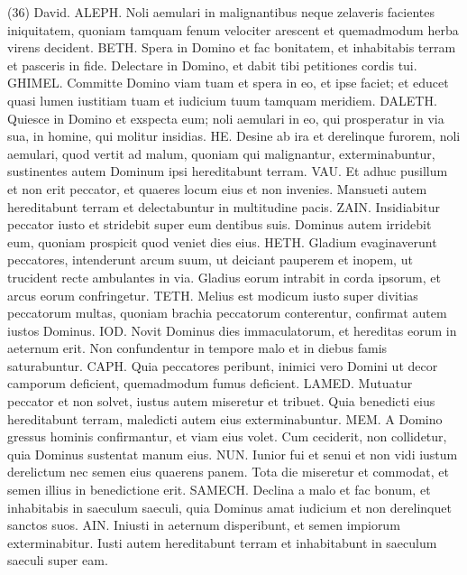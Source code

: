 \begin{biblechapter}  (36) 
\verse David. ALEPH. Noli aemulari in malignantibus neque zelaveris facientes iniquitatem, 
\verse quoniam tamquam fenum velociter arescent et quemadmodum herba virens decident. 
\verse BETH. Spera in Domino et fac bonitatem, et inhabitabis terram et pasceris in fide. 
\verse Delectare in Domino, et dabit tibi petitiones cordis tui. 
\verse GHIMEL. Committe Domino viam tuam et spera in eo, et ipse faciet; 
\verse et educet quasi lumen iustitiam tuam et iudicium tuum tamquam meridiem. 
\verse DALETH. Quiesce in Domino et exspecta eum; noli aemulari in eo, qui prosperatur in via sua, in homine, qui molitur insidias. 
\verse HE. Desine ab ira et derelinque furorem, noli aemulari, quod vertit ad malum, 
\verse quoniam qui malignantur, exterminabuntur, sustinentes autem Dominum ipsi hereditabunt terram. 
\verse VAU. Et adhuc pusillum et non erit peccator, et quaeres locum eius et non invenies. 
\verse Mansueti autem hereditabunt terram et delectabuntur in multitudine pacis. 
\verse ZAIN. Insidiabitur peccator iusto et stridebit super eum dentibus suis. 
\verse Dominus autem irridebit eum, quoniam prospicit quod veniet dies eius. 
\verse HETH. Gladium evaginaverunt peccatores, intenderunt arcum suum, ut deiciant pauperem et inopem, ut trucident recte ambulantes in via. 
\verse Gladius eorum intrabit in corda ipsorum, et arcus eorum confringetur. 
\verse TETH. Melius est modicum iusto super divitias peccatorum multas, 
\verse quoniam brachia peccatorum conterentur, confirmat autem iustos Dominus. 
\verse IOD. Novit Dominus dies immaculatorum, et hereditas eorum in aeternum erit. 
\verse Non confundentur in tempore malo et in diebus famis saturabuntur. 
\verse CAPH. Quia peccatores peribunt, inimici vero Domini ut decor camporum deficient, quemadmodum fumus deficient. 
\verse LAMED. Mutuatur peccator et non solvet, iustus autem miseretur et tribuet. 
\verse Quia benedicti eius hereditabunt terram, maledicti autem eius exterminabuntur. 
\verse MEM. A Domino gressus hominis confirmantur, et viam eius volet. 
\verse Cum ceciderit, non collidetur, quia Dominus sustentat manum eius. 
\verse NUN. Iunior fui et senui et non vidi iustum derelictum nec semen eius quaerens panem. 
\verse Tota die miseretur et commodat, et semen illius in benedictione erit. 
\verse SAMECH. Declina a malo et fac bonum, et inhabitabis in saeculum saeculi, 
\verse quia Dominus amat iudicium et non derelinquet sanctos suos. AIN. Iniusti in aeternum disperibunt, et semen impiorum exterminabitur. 
\verse Iusti autem hereditabunt terram et inhabitabunt in saeculum saeculi super eam. 

\end{biblechapter}
